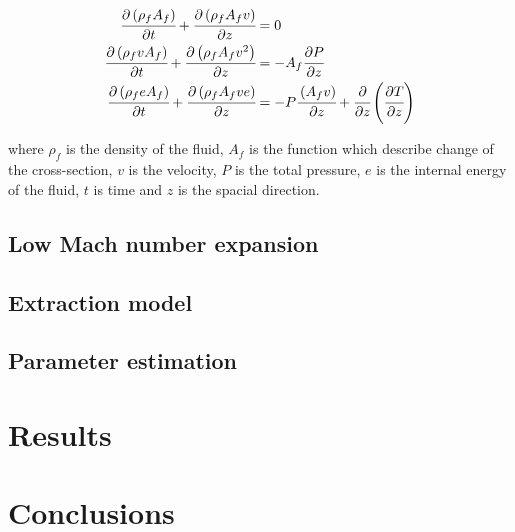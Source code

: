 \documentclass[a4paper,fleqn]{cas-dc}
\begin{document}
{\footnotesize
\begin{align}
        \cfrac{\partial \left( \rho_f A_f \right) }{\partial t} + \cfrac{\partial \left( \rho_f A_f v \right)}{\partial z} &= 0 \\
        \cfrac{\partial \left( \rho_f v A_f \right) }{\partial t} + \cfrac{\partial \left( \rho_f A_f v^2 \right)}{\partial z} &= -A_f \cfrac{\partial P}{\partial z} \\
        \cfrac{\partial \left( \rho_f e A_f \right) }{\partial t} + \cfrac{\partial \left( \rho_f A_f v e\right)}{\partial z} &= -P\cfrac{\left( A_f v \right)}{\partial z} + \cfrac{\partial}{\partial z} \left( \cfrac{\partial T}{\partial z} \right)   
    \end{align}  
\label{EQ: CompressibleEuler}
}

where $\rho_f$ is the density of the fluid, $A_f$ is the function which describe change of the cross-section, $v$ is the velocity, $P$ is the total pressure, $e$ is the internal energy of the fluid, $t$ is time and $z$ is the spacial direction.

\subsection{Low Mach number expansion}


\subsection{Extraction model} \label{CH: Extraction_model}


%

\subsection{Parameter estimation} \label{CH: Parameter_estimation}


\section{Results} \label{CH: Results}

\section{Conclusions}
\end{document}
